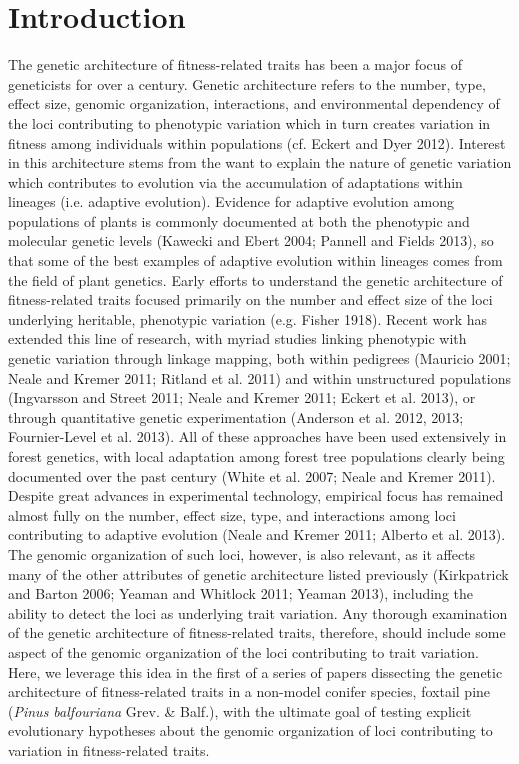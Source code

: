 \documentclass[11pt]{article}
\begin{document}
\section*{Introduction}
The genetic architecture of fitness-related traits has been a major focus of geneticists for 
over a century. Genetic architecture refers to the number, type, effect size, genomic organization, 
interactions, and environmental dependency of the loci contributing to phenotypic variation 
which in turn creates variation in fitness among individuals within populations (cf. Eckert and Dyer 2012). 
Interest in this architecture stems from the want to explain the nature of genetic variation which 
contributes to evolution via the accumulation of adaptations within lineages (i.e. adaptive evolution).
Evidence for adaptive evolution among populations of plants is commonly documented at both the phenotypic 
and molecular genetic levels (Kawecki and Ebert 2004; Pannell and Fields 2013), so that some of the best
examples of adaptive evolution within lineages comes from the field of plant genetics.
Early efforts to understand the genetic architecture of fitness-related traits
focused primarily on the number and effect size of the loci underlying heritable, phenotypic variation (e.g. Fisher 1918). 
Recent work has extended this line of research, with myriad studies linking phenotypic with genetic variation 
through linkage mapping, both within pedigrees (Mauricio 2001; Neale and Kremer 2011; Ritland et al. 2011) and within 
unstructured populations (Ingvarsson and Street 2011; Neale and Kremer 2011; Eckert et al. 2013), 
or through quantitative genetic experimentation (Anderson et al. 2012, 2013; Fournier-Level et al. 2013). All of these approaches 
have been used extensively in forest genetics, with local adaptation among forest tree populations clearly
being documented over the past century (White et al. 2007; Neale and Kremer 2011). Despite great advances in experimental technology, empirical 
focus has remained almost fully on the number, effect size, type, and interactions among loci contributing 
to adaptive evolution (Neale and Kremer 2011; Alberto et al. 2013). The genomic organization of such loci, however, 
is also relevant, as it affects many of the other attributes of genetic architecture listed previously 
(Kirkpatrick and Barton 2006; Yeaman and Whitlock 2011; Yeaman 2013), including the ability to detect the loci as underlying trait variation. 
Any thorough examination of the genetic architecture of fitness-related traits, therefore, should include 
some aspect of the genomic organization of the loci contributing to trait variation. Here, we leverage 
this idea in the first of a series of papers dissecting the genetic architecture of fitness-related 
traits in a non-model conifer species, foxtail pine (\textit{Pinus balfouriana} Grev. \& Balf.), with the 
ultimate goal of testing explicit evolutionary hypotheses about the genomic organization of loci 
contributing to variation in fitness-related traits.
\end{document}
